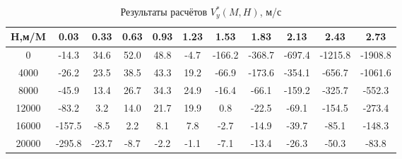 \begin{table}[H]
\centering
\caption{Результаты расчётов $V^*_y(M,H)$, м/с}
\label{Vy}
\begin{tabular}{|c|c|c|c|c|c|c|c|c|c|c|}
\toprule
H,м/M &   0.03 &  0.33 &  0.63 &  0.93 &  1.23 &   1.53 &   1.83 &   2.13 &    2.43 &    2.73 \\
\midrule
0     &  -14.3 &  34.6 &  52.0 &  48.8 &  -4.7 & -166.2 & -368.7 & -697.4 & -1215.8 & -1908.8 \\
4000  &  -26.2 &  23.5 &  38.5 &  43.3 &  19.2 &  -66.9 & -173.6 & -354.1 &  -656.7 & -1061.6 \\
8000  &  -45.9 &  13.4 &  26.7 &  34.3 &  24.9 &  -16.4 &  -66.1 & -159.2 &  -325.7 &  -552.3 \\
12000 &  -83.2 &   3.2 &  14.0 &  21.7 &  19.9 &    0.8 &  -22.5 &  -69.1 &  -154.5 &  -273.4 \\
16000 & -157.5 &  -8.5 &   2.2 &   8.1 &   7.8 &   -2.7 &  -14.9 &  -39.7 &   -85.1 &  -148.3 \\
20000 & -295.8 & -23.7 &  -8.7 &  -2.2 &  -1.1 &   -7.1 &  -13.4 &  -26.3 &   -50.3 &   -83.8 \\
\bottomrule
\end{tabular}
\end{table}
